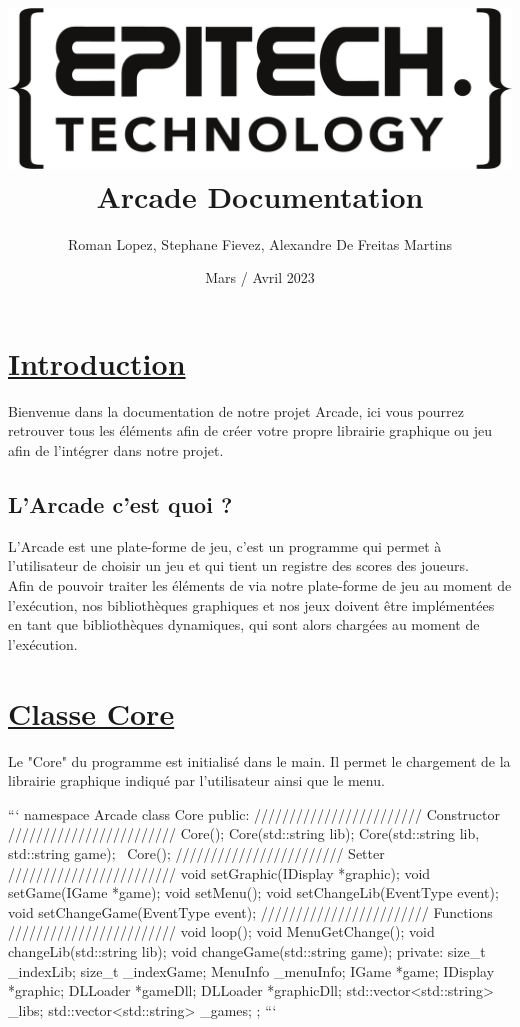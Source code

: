 \documentclass{report}
\title{\includegraphics{epitechLogo.png} \\ \vspace{0.5cm} Arcade Documentation}
\author{Roman Lopez, Stephane Fievez, Alexandre De Freitas Martins}
\date{Mars / Avril 2023}
\begin{document}
\maketitle

\section{\underline{Introduction}}

Bienvenue dans la documentation de notre projet Arcade, ici vous pourrez retrouver tous les éléments afin de créer votre propre librairie graphique ou jeu afin de l'intégrer dans notre projet.

\subsection{L'Arcade c'est quoi ?}

L'Arcade est une plate-forme de jeu, c'est un programme qui permet à l'utilisateur de choisir un jeu et qui tient un registre des scores des joueurs. \\
Afin de pouvoir traiter les éléments de via notre plate-forme de jeu au moment de l'exécution, nos bibliothèques graphiques et nos jeux doivent être implémentées en tant que bibliothèques dynamiques, qui sont alors chargées au moment de l'exécution.

\section{\underline{Classe Core}}

Le "Core" du programme est initialisé dans le main. Il permet le chargement de la librairie graphique indiqué par l’utilisateur ainsi que le menu.

\begin{tcolorbox}[colback=black!75!white]
{\color{white}
\begin{markdown}
```
namespace Arcade {
    class Core {
        public:
            //////////////////////// Constructor ////////////////////////
            Core();
            Core(std::string lib);
            Core(std::string lib, std::string game);
            ~Core();
            //////////////////////// Setter ////////////////////////
            void setGraphic(IDisplay *graphic);
            void setGame(IGame *game);
            void setMenu();
            void setChangeLib(EventType event);
            void setChangeGame(EventType event);
            //////////////////////// Functions ////////////////////////
            void loop();
            void MenuGetChange();
            void changeLib(std::string lib);
            void changeGame(std::string game);
        private:
            size_t _indexLib;
            size_t _indexGame;
            MenuInfo _menuInfo;
            IGame *game;
            IDisplay *graphic;
            DLLoader *gameDll;
            DLLoader *graphicDll;
            std::vector<std::string> _libs;
            std::vector<std::string> _games;
    };
}
```
\end{markdown}
}
\end{tcolorbox}
\end{document}
